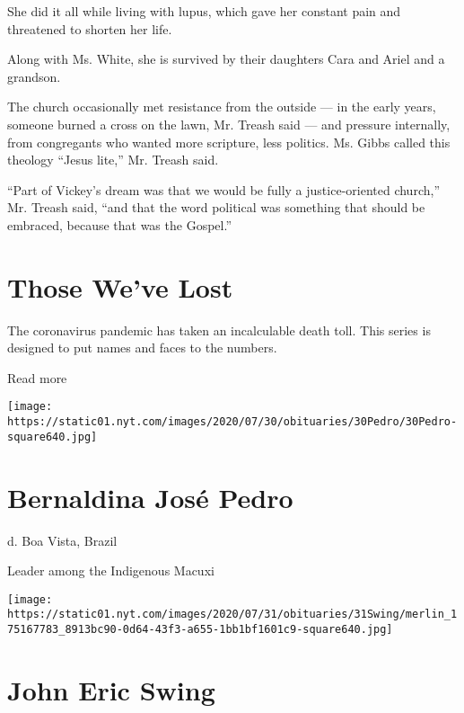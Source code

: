 She did it all while living with lupus, which gave her constant pain and
threatened to shorten her life.

Along with Ms. White, she is survived by their daughters Cara and Ariel
and a grandson.

The church occasionally met resistance from the outside --- in the early
years, someone burned a cross on the lawn, Mr. Treash said --- and
pressure internally, from congregants who wanted more scripture, less
politics. Ms. Gibbs called this theology ``Jesus lite,'' Mr. Treash
said.

``Part of Vickey's dream was that we would be fully a justice-oriented
church,'' Mr. Treash said, ``and that the word political was something
that should be embraced, because that was the Gospel.''

\href{https://www.nytimes.com/interactive/2020/obituaries/people-died-coronavirus-obituaries.html?action=click\&pgtype=Article\&state=default\&region=BELOW_MAIN_CONTENT\&context=covid_obits_promo}{}

\hypertarget{those-weve-lost}{%
\section{Those We've Lost}\label{those-weve-lost}}

The coronavirus pandemic has taken an incalculable death toll. This
series is designed to put names and faces to the numbers.

Read more

\texttt{[image: https://static01.nyt.com/images/2020/07/30/obituaries/30Pedro/30Pedro-square640.jpg]}

\hypertarget{bernaldina-josuxe9-pedro}{%
\section{Bernaldina José Pedro}\label{bernaldina-josuxe9-pedro}}

d. Boa Vista, Brazil

Leader among the Indigenous Macuxi

\texttt{[image: https://static01.nyt.com/images/2020/07/31/obituaries/31Swing/merlin\_175167783\_8913bc90-0d64-43f3-a655-1bb1bf1601c9-square640.jpg]}

\hypertarget{john-eric-swing}{%
\section{John Eric Swing}\label{john-eric-swing}}

